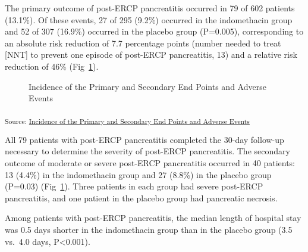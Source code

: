 \documentclass[
  10pt,
  letterpaper,
]{article}
\begin{document}
The primary outcome of post-ERCP pancreatitis occurred in 79 of 602
patients (13.1\%). Of these events, 27 of 295 (9.2\%) occurred in the
indomethacin group and 52 of 307 (16.9\%) occurred in the placebo group
(P=0.005), corresponding to an absolute risk reduction of 7.7 percentage
points (number needed to treat {[}NNT{]} to prevent one episode of
post-ERCP pancreatitis, 13) and a relative risk reduction of 46\%
(Fig~\ref{fig-incidences-adverse-events}).

\begin{figure}[H]


\caption{\label{fig-incidences-adverse-events}Incidence of the Primary
and Secondary End Points and Adverse Events}

\end{figure}%

\textsubscript{Source:
\href{https://mine-cetinkaya-rundel.github.io/indo-rct/notebooks/incidences-preview.html\#cell-fig-incidences-adverse-events}{Incidence
of the Primary and Secondary End Points and Adverse Events}}

All 79 patients with post-ERCP pancreatitis completed the 30-day
follow-up necessary to determine the severity of post-ERCP pancreatitis.
The secondary outcome of moderate or severe post-ERCP pancreatitis
occurred in 40 patients: 13 (4.4\%) in the indomethacin group and 27
(8.8\%) in the placebo group (P=0.03)
(Fig~\ref{fig-incidences-adverse-events}). Three patients in each group
had severe post-ERCP pancreatitis, and one patient in the placebo group
had pancreatic necrosis.

Among patients with post-ERCP pancreatitis, the median length of
hospital stay was 0.5 days shorter in the indomethacin group than in the
placebo group (3.5 vs.~4.0 days, P\textless0.001).
\end{document}
